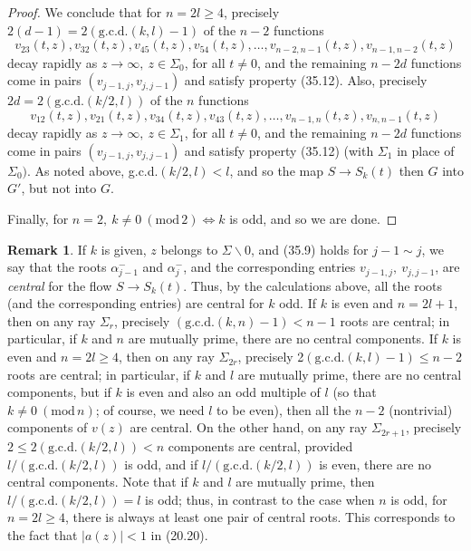 \documentclass{surv-l}
\theoremstyle{plain}
\theoremstyle{definition}
\newtheorem{remark}[theorem]{Remark}
\numberwithin{equation}{chapter}
\begin{document}
\begin{proof}
We conclude that for $n=2l\geq 4$, precisely $2(d-1)=2(\mathrm{g.c.d.}(k, l)-1)$ of the $n-2$ functions
\begin{equation*}
v_{23}(t, z), v_{32}(t, z), v_{45}(t, z),v_{54}(t, z),\ldots,v_{n-2,n-1}(t,z),v_{n-1,n-2}(t, z)
\end{equation*}
decay rapidly as $ z\rightarrow\infty,\ z\in\Sigma_{0}$, for all $t\neq 0$, and the remaining $n-2d$ functions come in pairs $(v_{j-1,j},v_{j,j-1})$ and satisfy property (35.12). Also, precisely $2d= 2(\mathrm{g.c.d.}(k/2,l))$ of the $n$ functions
\begin{equation*}
v_{12}(t, z),v_{21}(t, z),v_{34}(t, z),v_{43}(t, z),\ldots,v_{n-1,n}(t, z),v_{n,n-1}(t, z)
\end{equation*}
decay rapidly as $ z\rightarrow\infty,\ z\in\Sigma_{1}$, for all $t\neq 0$, and the remaining $n-2d$ functions come in pairs $(v_{j-1,j}, v_{j,j-1})$ and satisfy property (35.12) (with $\Sigma_{1}$ in place of $\Sigma_{0})$. As noted above, g.c.d.$(k/2, l)<l$, and so the map $S\rightarrow S_{k}(t)$ then $G$ into $G'$, but not into $G$.

Finally, for $n=2,\ k\neq 0\ (\mathrm{mod}\, 2)\Leftrightarrow k$ is odd, and so we are done.\quad
\end{proof}
\setcounter{theorem}{16}
\begin{remark}\label{rem35.17}
If $k$ is given, $z$ belongs to $\Sigma\backslash 0$, and (35.9) holds for $j-1\sim j$, we say that the roots $\alpha_{j-1}^{-}$ and $\alpha_{j}^{-}$, and the corresponding entries $v_{j-1,j},\ v_{j,j-1}$, are \emph{central} for the flow $S\rightarrow S_{k}(t)$. Thus, by the calculations above, all the roots (and the corresponding entries) are central for $k$ odd. If $k$ is even and $n=2l+1$, then on any ray $\Sigma_{r}$, precisely $(\mathrm{g.c.d.}(k, n)-1)<n-1$ roots are central; in particular, if $k$ and $n$ are mutually prime, there are no central components. If $k$ is even and $n=2l\geq 4$, then on any ray $\Sigma_{2r}$, precisely 2$(\mathrm{g.c.d.}(k, l) -1)\leq n-2$ roots are central; in particular, if $k$ and $l$ are mutually prime, there are no central components, but if $k$ is even and also an odd multiple of $l$ (so that $k\neq 0\ (\mathrm{mod}\, n)$; of course, we need $l$ to be even), then all the $n-2$ (nontrivial) components of $v(z)$ are central. On the other hand, on any ray $\Sigma_{2r+1}$, precisely $2\leq 2(\mathrm{g.c.d.}(k/2,l))<n$ components are central, provided $l/(\mathrm{g.c.d.}(k/2,l))$ is odd, and if $l/(\mathrm{g.c.d.}(k/2,l))$ is even, there are no central components. Note that if $k$ and $l$ are mutually prime, then $l/(\mathrm{g.c.d.}(k/2, l))=l$ is odd; thus, in contrast to the case when $n$ is odd, for $n=2l\geq 4$, there is always at least one pair of central roots. This corresponds to the fact that $|a(z)|<1$ in (20.20).
\end{remark}
\end{document}
